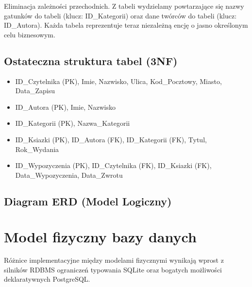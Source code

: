 \documentclass[a4paper,11pt,english,openany,oneside]{sphinxmanual}
\begin{document}
\sphinxAtStartPar
{}
Eliminacja zależności przechodnich. Z tabeli  wydzielamy powtarzające się nazwy gatunków do tabeli  (klucz: ID\_Kategorii) oraz dane twórców do tabeli  (klucz: ID\_Autora). Każda tabela reprezentuje teraz niezależną encję o jasno określonym celu biznesowym.


\subsection{Ostateczna struktura tabel (3NF)}
\label{\detokenize{rozdzial_3/index:ostateczna-struktura-tabel-3nf}}\begin{itemize}
\item {} 
\sphinxAtStartPar
{} ID\_Czytelnika (PK), Imie, Nazwisko, Ulica, Kod\_Pocztowy, Miasto, Data\_Zapisu

\item {} 
\sphinxAtStartPar
{} ID\_Autora (PK), Imie, Nazwisko

\item {} 
\sphinxAtStartPar
{} ID\_Kategorii (PK), Nazwa\_Kategorii

\item {} 
\sphinxAtStartPar
{} ID\_Ksiazki (PK), ID\_Autora (FK), ID\_Kategorii (FK), Tytul, Rok\_Wydania

\item {} 
\sphinxAtStartPar
{} ID\_Wypozyczenia (PK), ID\_Czytelnika (FK), ID\_Ksiazki (FK), Data\_Wypozyczenia, Data\_Zwrotu

\end{itemize}


\subsection{Diagram ERD (Model Logiczny)}
\label{\detokenize{rozdzial_3/index:diagram-erd-model-logiczny}}
\noindent{}


\section{Model fizyczny bazy danych}
\label{\detokenize{rozdzial_3/index:model-fizyczny-bazy-danych}}
\sphinxAtStartPar
Różnice implementacyjne między modelami fizycznymi wynikają wprost z silników RDBMS \textendash{} ograniczeń typowania SQLite oraz bogatych możliwości deklaratywnych PostgreSQL.
\end{document}
